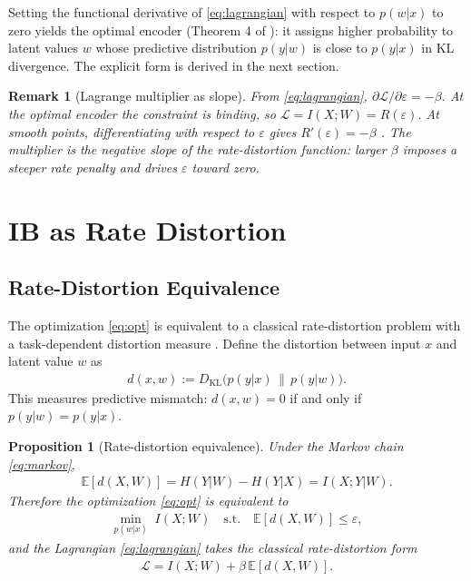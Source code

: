 \documentclass[11pt]{article}
\newtheorem{proposition}{Proposition}
\newtheorem{remark}{Remark}
\begin{document}
Setting the functional derivative of \eqref{eq:lagrangian} with
respect to $p(w|x)$ to zero yields the optimal encoder (Theorem 4 of
\cite{tishby1999information}): it assigns higher probability to latent
values $w$ whose predictive distribution $p(y|w)$ is close to $p(y|x)$
in KL divergence.
The explicit form is derived in the next section.

\begin{remark}[Lagrange multiplier as slope]
\label{rem:beta_slope}
From \eqref{eq:lagrangian}, $\partial\mathcal{L}/\partial\varepsilon=-\beta$.
At the optimal encoder the constraint is binding, so $\mathcal{L}=I(X;W)=R(\varepsilon)$.
At smooth points, differentiating with respect to $\varepsilon$ gives
$R'(\varepsilon)=-\beta$ \cite[Ch.~10]{cover2006elements}.
The multiplier is the negative slope of the rate-distortion function:
larger $\beta$ imposes a steeper rate penalty and drives $\varepsilon$ toward zero.
\end{remark}


\section{IB as Rate Distortion}

\subsection{Rate-Distortion Equivalence}

The optimization \eqref{eq:opt} is equivalent to a classical
rate-distortion problem \cite{shannon1959coding,berger1971rate} with a
task-dependent distortion measure \cite{harremoes2007information}.
Define the distortion between input $x$ and latent value $w$ as
\begin{align}
    d(x,w) := D_{\mathrm{KL}}\bigl(p(y|x)\,\|\,p(y|w)\bigr).
    \label{eq:distortion}
\end{align}
This measures predictive mismatch: $d(x,w)=0$ if and only if
$p(y|w)=p(y|x)$.

\begin{proposition}[Rate-distortion equivalence]
\label{prop:rd}
Under the Markov chain \eqref{eq:markov},
\begin{align}
    \mathbb{E}[d(X,W)] = H(Y|W) - H(Y|X) = I(X;Y|W).
    \label{eq:rd_identity}
\end{align}
Therefore the optimization \eqref{eq:opt} is equivalent to
\begin{align}
    \min_{p(w|x)} \; I(X;W) \quad \text{s.t.} \quad
    \mathbb{E}[d(X,W)] \leq \varepsilon,
    \label{eq:rd}
\end{align}
and the Lagrangian \eqref{eq:lagrangian} takes the classical
rate-distortion form \cite{berger1971rate}
\begin{align}
    \mathcal{L} = I(X;W) + \beta\,\mathbb{E}[d(X,W)].
    \label{eq:rd_lagrangian}
\end{align}
\end{proposition}
\end{document}
